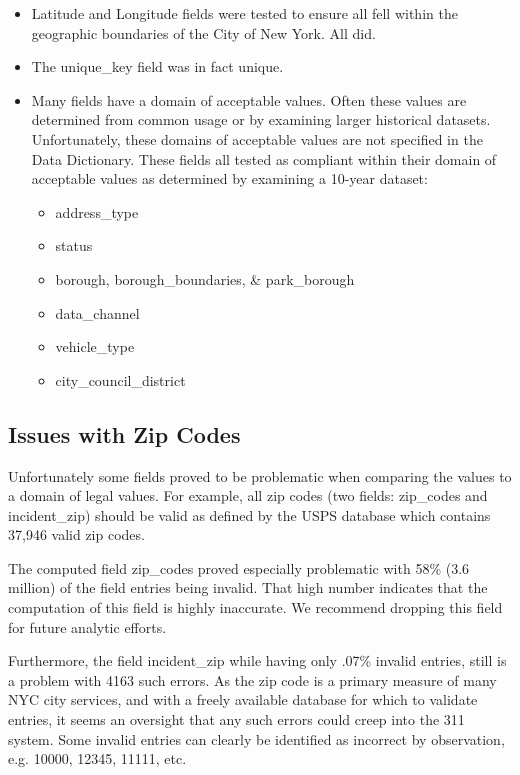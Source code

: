 \documentclass[12pt, titlepage]{article}
\begin{document}
\begin{itemize}
	\item Latitude and Longitude fields were tested to ensure all fell 
	within the geographic boundaries of the City of New York. All did.
	\item The unique\_key field was in fact unique.
	\item Many fields have a domain of acceptable values. Often these 
	values are determined from common usage or by examining
	larger historical datasets. Unfortunately, these domains of acceptable 
	values are not specified in the Data Dictionary. These fields all tested as 
	compliant within their domain of acceptable values as determined by 
	examining a 10-year dataset:
		\begin{itemize}
			\item address\_type
			\item status
			\item borough, borough\_boundaries, \& park\_borough 
			\item data\_channel
			\item vehicle\_type
			\item city\_council\_district
		\end{itemize}
\end{itemize}	

	\subsection{Issues with Zip Codes}
	\label{sec:zipcodesissues}
	 Unfortunately some fields proved to be  problematic when comparing 
	 the values to a domain of legal values. For example, all zip codes 
	 (two fields: zip\_codes and incident\_zip) should be valid as defined 
	 by the USPS database which contains 37,946 valid zip codes.
	 
	The computed field zip\_codes proved especially problematic with 
	58\% (3.6 million) of the field entries being invalid. That high number 
	indicates that the computation of this field is highly inaccurate. We 
	recommend dropping this field for future analytic efforts.
	
	Furthermore, the field incident\_zip while having only .07\% invalid entries, 
	still is a problem with 4163 such errors. As the zip code is a primary 
	measure of many NYC city services, and with a freely available 
	database for which to validate entries, it seems an oversight 
	that any such errors could creep into the 311 system. 
	Some invalid entries can clearly be identified as incorrect by 
	observation, e.g. 10000, 12345, 11111, etc. 
	
\end{document}
